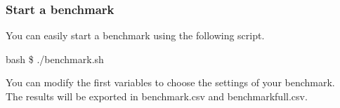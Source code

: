 \subsubsection{Start a benchmark}
You can easily start a benchmark using the following script.
\begin{resultbox}
    bash \$ ./benchmark.sh
\end{resultbox}
You can modify the first variables to choose the settings of your benchmark.\\
The results will be exported in benchmark.csv and benchmarkfull.csv.